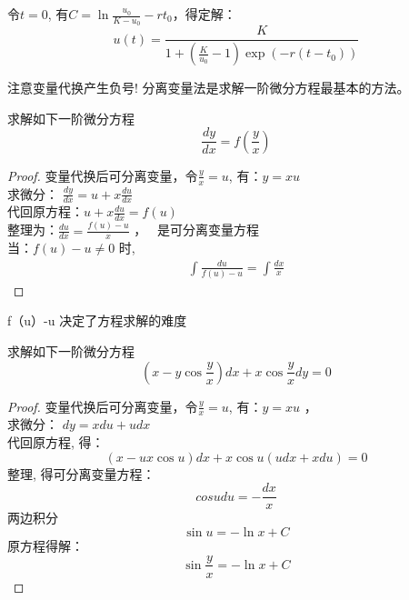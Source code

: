 令$t=0$, 有$C=\ln \frac{u_0}{K-u_0} -r t_0$，得定解：
\begin{equation*}
	u(t)  =\frac{K}{1+(\frac{K}{u_0}-1)   \exp (-r (t-t_0))}	
\end{equation*}
\begin{note}
	注意变量代换产生负号!  分离变量法是求解一阶微分方程最基本的方法。
\end{note}

\begin{example} %
	求解如下一阶微分方程
	\begin{equation*}
	\frac{d y}{d x}=f\left(\frac{y}{x}\right) 
	\end{equation*}
	
	\begin{proof} 变量代换后可分离变量，令$\frac{y}{x}=u$, 有：$y=xu$ \\ \vspace{0.3cm}
	求微分：	{\large $ \frac{d y}{d x}=u+x \frac{d u}{d x}$}\\	\vspace{0.3cm}
	代回原方程：{\large $ u+x \frac{d u}{d x}=f(u)$ }\\	\vspace{0.3cm}
	整理为：{\Large $\frac{d u}{d x}=\frac{f(u)-u}{x}$ }，\	\vspace{0.3cm}
	是可分离变量方程\\	\vspace{0.3cm}
	当：{\large $ f(u)-u \neq 0$ } 时,
		\begin{align*}
			\int \frac{d u}{f(u)-u}=\int \frac{d x}{x} 
		\end{align*}	
	\end{proof}
\end{example}

\begin{note}
	f（u）-u 决定了方程求解的难度
\end{note}

\begin{example} %
	求解如下一阶微分方程
	\begin{equation*}
	\left(x-y \cos \frac{y}{x}\right) d x+x \cos \frac{y}{x} d y=0
	\end{equation*}
	
	\begin{proof} 变量代换后可分离变量，令$\frac{y}{x}=u$, 有：$y=xu$ ， \\ \vspace{0.3cm}
	求微分：	$d y=x d u+u d x$  \\	\vspace{0.3cm}
	代回原方程, 得：
	\begin{equation*}
	(x-u x \cos u) d x+x \cos u(u d x+x d u)=0
	\end{equation*}	
	整理, 得可分离变量方程：
\begin{equation*}
cos udu=-\frac{dx}{x}
\end{equation*}	
两边积分
\begin{equation*}
\sin u=-\ln x+C
\end{equation*}	
原方程得解：
\begin{equation*}
	\sin \frac{y}{x}=-\ln x+C
\end{equation*}	
	\end{proof}
\end{example}

